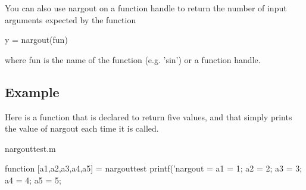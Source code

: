 You can also use {\ttfamily nargout} on a function handle to return the number of input arguments expected by the function \begin{DoxyVerb}  y = nargout(fun)
\end{DoxyVerb}
 where {\ttfamily fun} is the name of the function (e.\-g. {\ttfamily 'sin'}) or a function handle. \hypertarget{variables_struct_Example}{}\subsection{Example}\label{variables_struct_Example}
Here is a function that is declared to return five values, and that simply prints the value of {\ttfamily nargout} each time it is called.

\begin{DoxyVerb}     nargouttest.m
\end{DoxyVerb}



\begin{DoxyVerbInclude}
function [a1,a2,a3,a4,a5] = nargouttest
  printf('nargout = %
  a1 = 1; a2 = 2; a3 = 3; a4 = 4; a5 = 5;
\end{DoxyVerbInclude}



